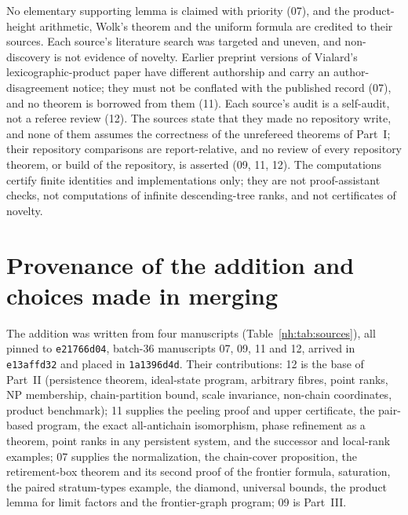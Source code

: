 \documentclass[11pt,a4paper]{article}
\theoremstyle{definition}
\theoremstyle{remark}
\begin{document}
No elementary supporting lemma is claimed with priority (07), and the product-height
arithmetic, Wolk's theorem and the uniform formula are credited to their sources.
Each source's literature search was targeted and uneven, and non-discovery is not
evidence of novelty. Earlier preprint versions of Vialard's lexicographic-product
paper have different authorship and carry an author-disagreement notice; they must
not be conflated with the published record \cite{Vialard2025} (07), and no theorem is
borrowed from them (11). Each source's audit is a self-audit, not a referee review
(12). The sources state that they made no repository write, and none of them
assumes the correctness of the unrefereed theorems of Part~I; their
repository comparisons are report-relative, and no review of every repository
theorem, or build of the repository, is asserted (09, 11, 12). The computations
certify finite identities and implementations only; they are not proof-assistant
checks, not computations of infinite descending-tree ranks, and not certificates of
novelty.

\section{Provenance of the addition and choices made in merging}\label{nh:sec:choices}

The addition was written from four manuscripts (Table~\ref{nh:tab:sources}), all
pinned to \texttt{e21766d04}, batch-36 manuscripts 07, 09, 11 and 12, arrived in
\texttt{e13affd32} and placed in \texttt{1a1396d4d}. Their contributions:
12 is the base of Part~II (persistence theorem, ideal-state program, arbitrary
fibres, point ranks, NP membership, chain-partition bound, scale invariance,
non-chain coordinates, product benchmark); 11 supplies the peeling proof and upper
certificate, the pair-based program, the exact all-antichain isomorphism, phase
refinement as a theorem, point ranks in any persistent system, and the successor and
local-rank examples; 07 supplies the normalization, the chain-cover proposition, the
retirement-box theorem and its second proof of the frontier formula, saturation, the
paired stratum-types example, the diamond, universal bounds, the product lemma for
limit factors and the frontier-graph program; 09 is Part~III.
\end{document}
